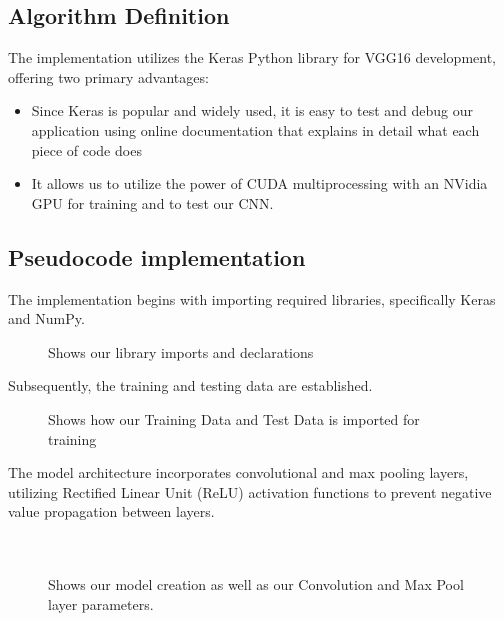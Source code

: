 \documentclass[conference]{IEEEtran}
\begin{document}
\subsection{Algorithm Definition}
The implementation utilizes the Keras Python library for VGG16 development, offering two primary advantages:

\begin{itemize}
\item Since Keras is popular and widely used, it is easy to test and debug our application using online documentation that explains in detail what each piece of code does
\item It allows us to utilize the power of CUDA multiprocessing with an NVidia GPU for training and to test our CNN.
\end{itemize}

\subsection{Pseudocode implementation}
The implementation begins with importing required libraries, specifically Keras and NumPy.
\begin{figure}[htbp]
    \centering
    \caption{Shows our library imports and declarations}
    \label{fig:1.0}
\end{figure}
\FloatBarrier 

Subsequently, the training and testing data are established.
\begin{figure}[htbp]
    \centering
    \caption{Shows how our Training Data and Test Data is imported for training}
    \label{fig:1.1}
\end{figure}
\FloatBarrier 

The model architecture incorporates convolutional and max pooling layers, utilizing Rectified Linear Unit (ReLU) activation functions to prevent negative value propagation between layers.\\
\\
\\
\begin{figure}[htbp]
    \centering
    \caption{Shows our model creation as well as our Convolution and Max Pool layer parameters.}
    \label{fig:1.2}
\end{figure}
\FloatBarrier 
\end{document}

